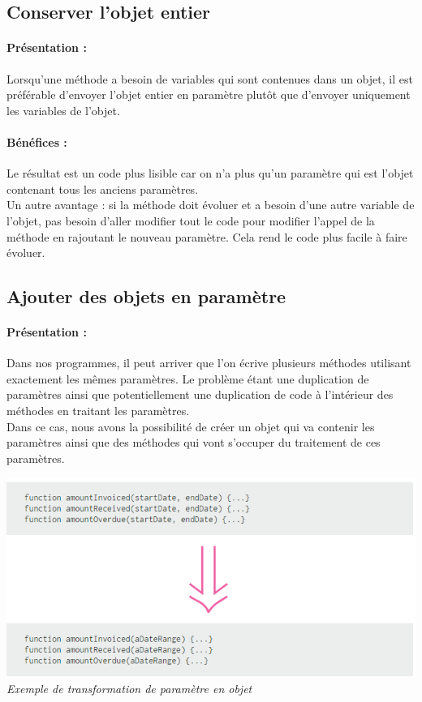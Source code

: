 \documentclass[a4paper,twoside,12pt,openright]{report}
\begin{document}
\subsection{Conserver l'objet entier}
\paragraph{Présentation :}
Lorsqu'une méthode a besoin de variables qui sont contenues dans un objet, il est préférable d'envoyer l'objet entier en paramètre plutôt que d'envoyer uniquement les variables de l'objet.

\paragraph{Bénéfices :}
Le résultat est un code plus lisible car on n'a plus qu'un paramètre qui est l'objet contenant tous les anciens paramètres.\\
Un autre avantage : si la méthode doit évoluer et a besoin d'une autre variable de l'objet, pas besoin d'aller modifier tout le code pour modifier l'appel de la méthode en rajoutant le nouveau paramètre. Cela rend le code plus facile à faire évoluer.\\

\subsection{Ajouter des objets en paramètre}
\paragraph{Présentation :}
Dans nos programmes, il peut arriver que l'on écrive plusieurs méthodes utilisant exactement les mêmes paramètres. Le problème étant une duplication de paramètres ainsi que potentiellement une duplication de code à l'intérieur des méthodes en traitant les paramètres.\\
Dans ce cas, nous avons la possibilité de créer un objet qui va contenir les paramètres ainsi que des méthodes qui vont s'occuper du traitement de ces paramètres.\\

\begin{center}
\includegraphics[scale=1]{Image/Ajout_Objet_Parametre.png}\\
\itshape{Exemple de transformation de paramètre en objet \cite{ref8}}
\end{center}
\end{document}
